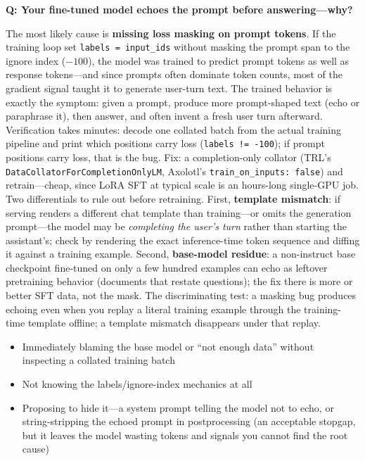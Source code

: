 \begin{interviewq}
\textbf{Q: Your fine-tuned model echoes the prompt before answering---why?}

 \quad {} \quad \badgefreq{\freqhigh}

\stronganswer The most likely cause is \textbf{missing loss masking on prompt tokens}. If the training loop set \texttt{labels = input\_ids} without masking the prompt span to the ignore index ($-100$), the model was trained to predict prompt tokens as well as response tokens---and since prompts often dominate token counts, most of the gradient signal taught it to generate user-turn text. The trained behavior is exactly the symptom: given a prompt, produce more prompt-shaped text (echo or paraphrase it), then answer, and often invent a fresh user turn afterward. Verification takes minutes: decode one collated batch from the actual training pipeline and print which positions carry loss (\texttt{labels != -100}); if prompt positions carry loss, that is the bug. Fix: a completion-only collator (TRL's \texttt{DataCollatorForCompletionOnlyLM}, Axolotl's \texttt{train\_on\_inputs: false}) and retrain---cheap, since LoRA SFT at typical scale is an hours-long single-GPU job. Two differentials to rule out before retraining. First, \textbf{template mismatch}: if serving renders a different chat template than training---or omits the generation prompt---the model may be \emph{completing the user's turn} rather than starting the assistant's; check by rendering the exact inference-time token sequence and diffing it against a training example. Second, \textbf{base-model residue}: a non-instruct base checkpoint fine-tuned on only a few hundred examples can echo as leftover pretraining behavior (documents that restate questions); the fix there is more or better SFT data, not the mask. The discriminating test: a masking bug produces echoing even when you replay a literal training example through the training-time template offline; a template mismatch disappears under that replay.

\redflags
\begin{itemize}
    \item Immediately blaming the base model or ``not enough data'' without inspecting a collated training batch
    \item Not knowing the labels/ignore-index mechanics at all
    \item Proposing to hide it---a system prompt telling the model not to echo, or string-stripping the echoed prompt in postprocessing (an acceptable stopgap, but it leaves the model wasting tokens and signals you cannot find the root cause)
\end{itemize}


\end{interviewq}
